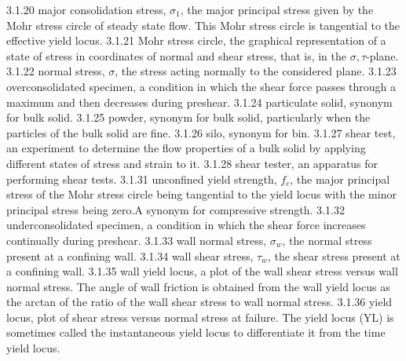 3.1.20 major consolidation stress, $\sigma_1$, the major principal stress given by the Mohr stress circle of steady state flow. This Mohr stress circle is tangential to the effective yield locus.
3.1.21 Mohr stress circle, the graphical representation of a state of stress in coordinates of normal and shear stress, that is, in the $\sigma, \tau$-plane.
3.1.22 normal stress, $\sigma$, the stress acting normally to the considered plane.
3.1.23 overconsolidated specimen, a condition in which the shear force passes through a maximum and then decreases during preshear.
3.1.24 particulate solid, synonym for bulk solid.
3.1.25 powder, synonym for bulk solid, particularly when the particles of the bulk solid are fine.
3.1.26 silo, synonym for bin.
3.1.27 shear test, an experiment to determine the flow properties of a bulk solid by applying different states of stress and strain to it.
3.1.28 shear tester, an apparatus for performing shear tests.
3.1.31 unconfined yield strength, $f_c$, the major principal stress of the Mohr stress circle being tangential to the yield locus with the minor principal stress being zero.A synonym for compressive strength.
3.1.32 underconsolidated specimen, a condition in which the shear force increases continually during preshear.
3.1.33 wall normal stress, $\sigma_w$, the normal stress present at a confining wall.
3.1.34 wall shear stress, $\tau_w$, the shear stress present at a confining wall.
3.1.35 wall yield locus,  a plot of the wall shear stress versus wall normal stress. The angle of wall friction is obtained from the wall yield locus as the arctan of the ratio of the wall shear stress to wall normal stress.
3.1.36 yield locus, plot of shear stress versus normal stress at failure. The yield locus (YL) is sometimes called the instantaneous yield locus to differentiate it from the time yield locus.
 

